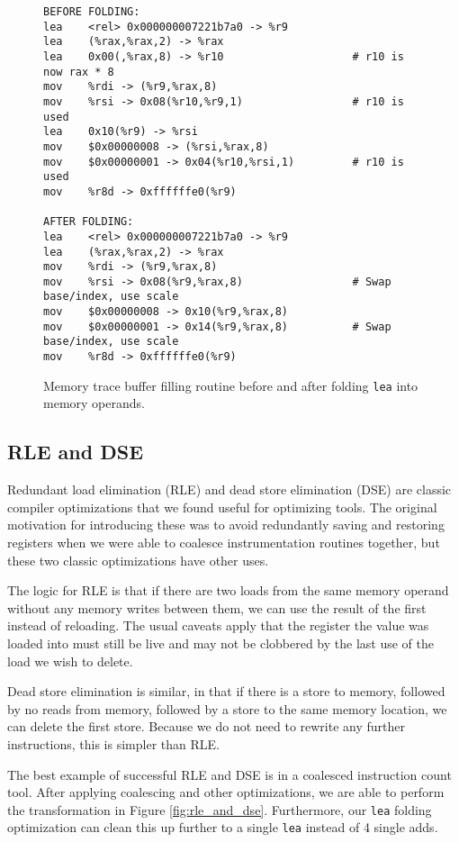 \begin{figure}
\begin{verbatim}
BEFORE FOLDING:
lea    <rel> 0x000000007221b7a0 -> %r9
lea    (%rax,%rax,2) -> %rax
lea    0x00(,%rax,8) -> %r10                    # r10 is now rax * 8
mov    %rdi -> (%r9,%rax,8)
mov    %rsi -> 0x08(%r10,%r9,1)                 # r10 is used
lea    0x10(%r9) -> %rsi
mov    $0x00000008 -> (%rsi,%rax,8)
mov    $0x00000001 -> 0x04(%r10,%rsi,1)         # r10 is used
mov    %r8d -> 0xffffffe0(%r9)

AFTER FOLDING:
lea    <rel> 0x000000007221b7a0 -> %r9
lea    (%rax,%rax,2) -> %rax
mov    %rdi -> (%r9,%rax,8)
mov    %rsi -> 0x08(%r9,%rax,8)                 # Swap base/index, use scale
mov    $0x00000008 -> 0x10(%r9,%rax,8)
mov    $0x00000001 -> 0x14(%r9,%rax,8)          # Swap base/index, use scale
mov    %r8d -> 0xffffffe0(%r9)
\end{verbatim}
\caption{Memory trace buffer filling routine before and after folding {\tt lea}
into memory operands.}
\label{fig:fold_lea}
\end{figure}

\subsection{RLE and DSE}

Redundant load elimination (RLE) and dead store elimination (DSE) are classic
compiler optimizations that we found useful for optimizing tools.  The original
motivation for introducing these was to avoid redundantly saving and restoring
registers when we were able to coalesce instrumentation routines together, but
these two classic optimizations have other uses.

The logic for RLE is that if there are two loads from the same memory operand
without any memory writes between them, we can use the result of the first
instead of reloading.  The usual caveats apply that the register the value was
loaded into must still be live and may not be clobbered by the last use of the
load we wish to delete.

Dead store elimination is similar, in that if there is a store to memory,
followed by no reads from memory, followed by a store to the same memory
location, we can delete the first store.  Because we do not need to rewrite any
further instructions, this is simpler than RLE.

The best example of successful RLE and DSE is in a coalesced instruction count
tool.  After applying coalescing and other optimizations, we are able to perform
the transformation in Figure \ref{fig:rle_and_dse}.  Furthermore, our {\tt lea}
folding optimization can clean this up further to a single {\tt lea} instead of
4 single adds.

